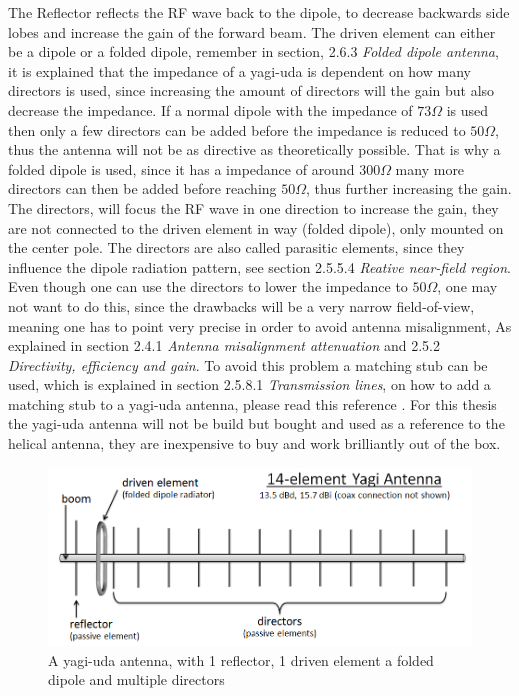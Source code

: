 The Reflector reflects the RF wave back to the dipole, to decrease backwards side lobes and increase the gain of the forward beam. The driven element can either be a dipole or a folded dipole, remember in section, 2.6.3 \textit{Folded dipole antenna}, it is explained that the impedance of a yagi-uda is dependent on how many directors is used, since increasing the amount of directors will the gain but also decrease the impedance. If a normal dipole with the impedance of $73\Omega$ is used then only a few directors can be added before the impedance is reduced to $50\Omega$, thus the antenna will not be as directive as theoretically possible. That is why a folded dipole is used, since it has a impedance of around $300\Omega$ many more directors can then be added before reaching $50\Omega$, thus further increasing the gain. The directors, will focus the RF wave in one direction to increase the gain, they are not connected to the driven element in way (folded dipole), only mounted on the center pole. The directors are also called parasitic elements, since they influence the dipole radiation pattern, see section 2.5.5.4 \textit{Reative near-field region}. Even though one can use the directors to lower the impedance to $50\Omega$, one may not want to do this, since the drawbacks will be a very narrow field-of-view, meaning one has to point very precise in order to avoid antenna misalignment, As explained in section 2.4.1 \textit{Antenna misalignment attenuation} and 2.5.2 \textit{Directivity, efficiency and gain}. To avoid this problem a matching stub can be used, which is explained in section 2.5.8.1 \textit{Transmission lines}, on how to add a matching stub to a yagi-uda antenna, please read this reference \cite{YagiMatching}. For this thesis the yagi-uda antenna will not be build but bought and used as a reference to the helical antenna, they are inexpensive to buy and work brilliantly out of the box.  

\begin{figure}[h]
\centering
\includegraphics[scale=0.5]{figures/yagi-uda.png}
\caption{A yagi-uda antenna, with 1 reflector, 1 driven element a folded dipole and multiple directors\cite{YagiUda}}
\end{figure}


